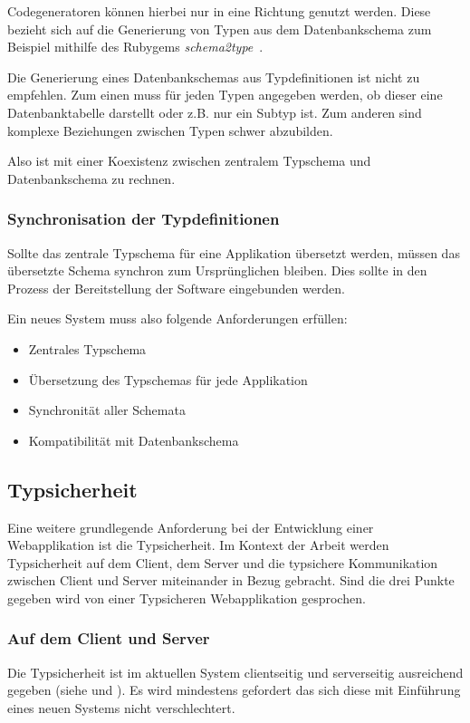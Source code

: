 Codegeneratoren können hierbei nur in eine Richtung genutzt werden.
Diese bezieht sich auf die Generierung von Typen aus dem Datenbankschema zum Beispiel mithilfe des Rubygems \emph{schema2type}~\cite{schema2type}.

Die Generierung eines Datenbankschemas aus Typdefinitionen ist nicht zu empfehlen.
Zum einen muss für jeden Typen angegeben werden, ob dieser eine Datenbanktabelle darstellt oder z.B. nur ein Subtyp ist.
Zum anderen sind komplexe Beziehungen zwischen Typen schwer abzubilden.

Also ist mit einer Koexistenz zwischen zentralem Typschema und Datenbankschema zu rechnen.

\subsubsection{Synchronisation der Typdefinitionen}
Sollte das zentrale Typschema für eine Applikation übersetzt werden,
müssen das übersetzte Schema synchron zum Ursprünglichen bleiben. Dies sollte in den Prozess der Bereitstellung der Software eingebunden werden.

Ein neues System muss also folgende Anforderungen erfüllen:

\begin{itemize}
    \setlength\itemsep{-1em}
    \item Zentrales Typschema
    \item Übersetzung des Typschemas für jede Applikation
    \item Synchronität aller Schemata
    \item Kompatibilität mit Datenbankschema
\end{itemize}

\subsection{Typsicherheit}
\label{req:typesafe}
Eine weitere grundlegende Anforderung bei der Entwicklung einer Webapplikation ist die Typsicherheit.
Im Kontext der Arbeit werden Typsicherheit auf dem Client,
dem Server und die typsichere Kommunikation zwischen Client und Server miteinander in Bezug gebracht.
Sind die drei Punkte gegeben wird von einer Typsicheren Webapplikation gesprochen.

\subsubsection{Auf dem Client und Server}
\label{req:typesafe:client}
Die Typsicherheit ist im aktuellen System clientseitig und serverseitig ausreichend gegeben (siehe  und ).
Es wird mindestens gefordert das sich diese mit Einführung eines neuen Systems nicht verschlechtert.

